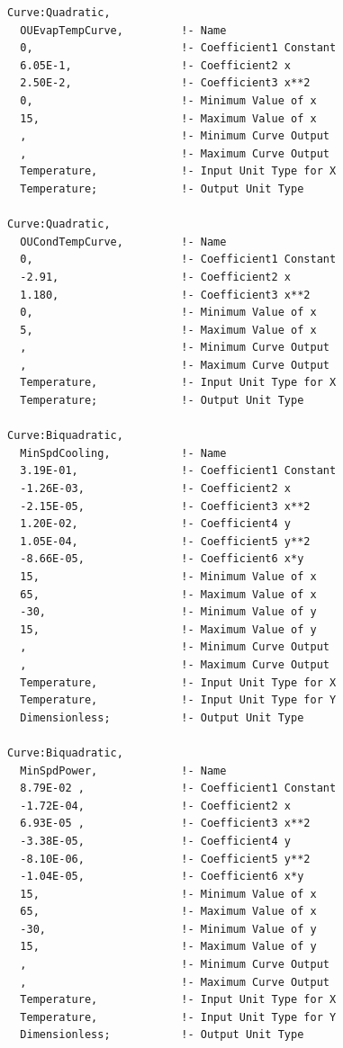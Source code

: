 \begin{lstlisting}
Curve:Quadratic,
  OUEvapTempCurve,         !- Name
  0,                       !- Coefficient1 Constant
  6.05E-1,                 !- Coefficient2 x
  2.50E-2,                 !- Coefficient3 x**2
  0,                       !- Minimum Value of x
  15,                      !- Maximum Value of x
  ,                        !- Minimum Curve Output
  ,                        !- Maximum Curve Output
  Temperature,             !- Input Unit Type for X
  Temperature;             !- Output Unit Type

Curve:Quadratic,
  OUCondTempCurve,         !- Name
  0,                       !- Coefficient1 Constant
  -2.91,                   !- Coefficient2 x
  1.180,                   !- Coefficient3 x**2
  0,                       !- Minimum Value of x
  5,                       !- Maximum Value of x
  ,                        !- Minimum Curve Output
  ,                        !- Maximum Curve Output
  Temperature,             !- Input Unit Type for X
  Temperature;             !- Output Unit Type

Curve:Biquadratic,
  MinSpdCooling,           !- Name
  3.19E-01,                !- Coefficient1 Constant
  -1.26E-03,               !- Coefficient2 x
  -2.15E-05,               !- Coefficient3 x**2
  1.20E-02,                !- Coefficient4 y
  1.05E-04,                !- Coefficient5 y**2
  -8.66E-05,               !- Coefficient6 x*y
  15,                      !- Minimum Value of x
  65,                      !- Maximum Value of x
  -30,                     !- Minimum Value of y
  15,                      !- Maximum Value of y
  ,                        !- Minimum Curve Output
  ,                        !- Maximum Curve Output
  Temperature,             !- Input Unit Type for X
  Temperature,             !- Input Unit Type for Y
  Dimensionless;           !- Output Unit Type

Curve:Biquadratic,
  MinSpdPower,             !- Name
  8.79E-02 ,               !- Coefficient1 Constant
  -1.72E-04,               !- Coefficient2 x
  6.93E-05 ,               !- Coefficient3 x**2
  -3.38E-05,               !- Coefficient4 y
  -8.10E-06,               !- Coefficient5 y**2
  -1.04E-05,               !- Coefficient6 x*y
  15,                      !- Minimum Value of x
  65,                      !- Maximum Value of x
  -30,                     !- Minimum Value of y
  15,                      !- Maximum Value of y
  ,                        !- Minimum Curve Output
  ,                        !- Maximum Curve Output
  Temperature,             !- Input Unit Type for X
  Temperature,             !- Input Unit Type for Y
  Dimensionless;           !- Output Unit Type


\end{lstlisting}
